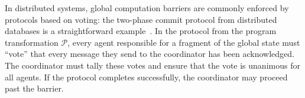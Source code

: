 


In
distributed systems, global computation barriers are commonly enforced by
protocols based on voting: the two-phase commit protocol from distributed
databases is a straightforward example~\cite{gray-tp}.  In the protocol from the program transformation $\mathcal{P}$, every agent
responsible for a fragment of the global state must ``vote'' that every message
they send to the coordinator has been acknowledged.  The coordinator must tally
these votes and ensure that the vote is unanimous for all agents.  If the
protocol completes successfully, the coordinator may proceed past the barrier.






